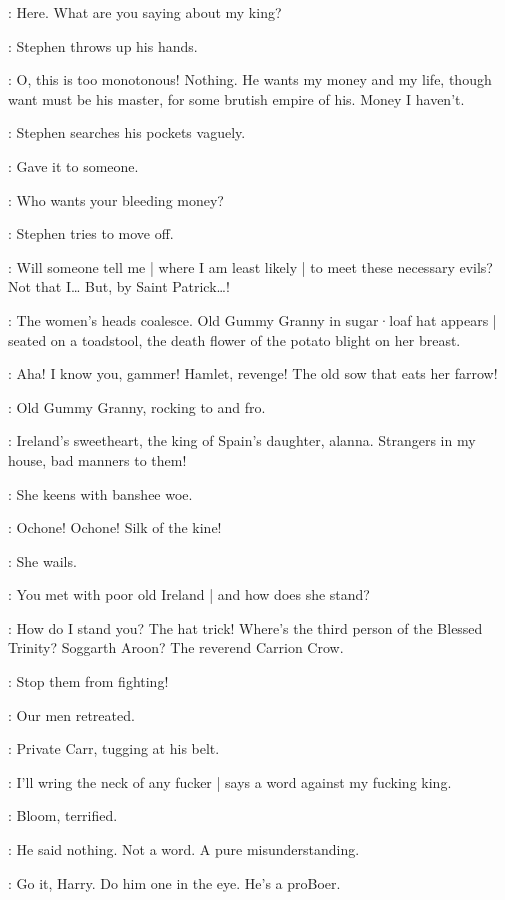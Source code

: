 \Carr[7b]:
Here.
What are you saying about my king?

:
Stephen throws up his hands.

\Stephen:
O,
this is too monotonous!
Nothing.
He wants my money and my life,
though want must be his master,
for some brutish empire of his.
Money I haven't.

:
Stephen searches his pockets vaguely.

\Stephen:
Gave it to someone.

\Carr:
Who wants your bleeding money?

:
Stephen tries to move off.

\Stephen:
Will someone tell me |
where I am least likely |
to meet these necessary evils?
Not that I…
But,
by Saint Patrick…!

:
The women's heads coalesce.
Old Gummy Granny in sugar·loaf hat appears |
seated on a toadstool,
the death flower of the potato blight on her breast.%

\Stephen:
Aha!
I know you,
gammer!
Hamlet,
revenge!
The old sow that eats her farrow!

:
Old Gummy Granny,
rocking to and fro.

\GummyGranny:
Ireland's sweetheart,
the king of Spain's daughter,
alanna.
Strangers in my house,
bad manners to them!

:
She keens with banshee woe.

\GummyGranny:
Ochone!
Ochone!
Silk of the kine!

:
She wails.

\GummyGranny:
You met with poor old Ireland |
and how does she stand?

\Stephen:
How do I stand you?
%
The hat trick!
Where's the third person of the Blessed Trinity?
Soggarth Aroon?
The reverend Carrion Crow.

\Cissy[7b]:
Stop them from fighting!

\ARough[7a]:
Our men retreated.

:
Private Carr,
tugging at his belt.

\Carr:
I'll wring the neck of any fucker |
says a word against my fucking king.

:
Bloom,
terrified.

\Bloom:
He said nothing.
Not a word.
A pure misunderstanding.

\Compton[7b]:
Go it,
Harry.
Do him one in the eye.
He's a proBoer.

